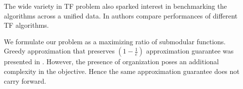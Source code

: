 The wide variety in TF problem also sparked interest in benchmarking the algorithms across a unified data. In \cite{wang2015comparative} authors compare performances of different TF algorithms. 

We formulate our problem as a maximizing ratio of submodular functions. Greedy approximation that preserves $( 1 - \frac{1}{e})$ approximation guarantee was presented in \cite{bai2016algorithms}. However, the presence of organization poses an additional complexity in the objective. Hence the same approximation guarantee does not carry forward. 


